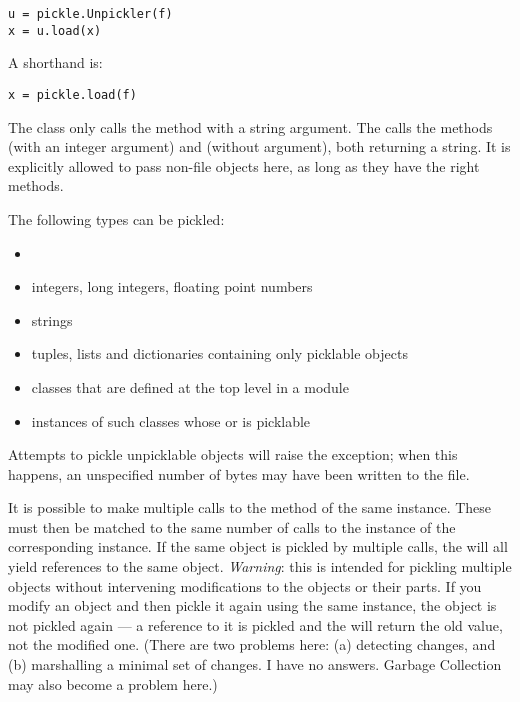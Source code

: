 \begin{verbatim}
u = pickle.Unpickler(f)
x = u.load(x)
\end{verbatim}

A shorthand is:

\begin{verbatim}
x = pickle.load(f)
\end{verbatim}

The  class only calls the method  with a
string argument.  The  calls the methods 
(with an integer argument) and  (without argument),
both returning a string.  It is explicitly allowed to pass non-file
objects here, as long as they have the right methods.

The following types can be pickled:
\begin{itemize}

\item {}

\item integers, long integers, floating point numbers

\item strings

\item tuples, lists and dictionaries containing only picklable objects

\item classes that are defined at the top level in a module

\item instances of such classes whose  or
 is picklable

\end{itemize}

Attempts to pickle unpicklable objects will raise the
 exception; when this happens, an unspecified
number of bytes may have been written to the file.

It is possible to make multiple calls to the  method of
the same  instance.  These must then be matched to the
same number of calls to the  instance of the
corresponding  instance.  If the same object is
pickled by multiple  calls, the  will all
yield references to the same object.  {\em Warning}: this is intended
for pickling multiple objects without intervening modifications to the
objects or their parts.  If you modify an object and then pickle it
again using the same  instance, the object is not
pickled again --- a reference to it is pickled and the
 will return the old value, not the modified one.
(There are two problems here: (a) detecting changes, and (b)
marshalling a minimal set of changes.  I have no answers.  Garbage
Collection may also become a problem here.)

